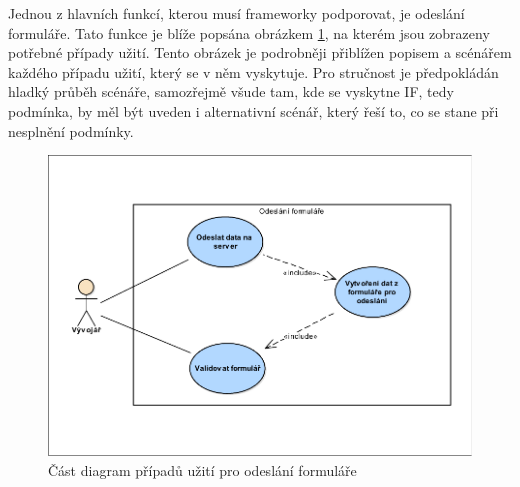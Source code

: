 Jednou z hlavních funkcí, kterou musí frameworky podporovat, je odeslání formuláře. Tato funkce je blíže popsána obrázkem \ref{img:useCaseModelFormSend}, na kterém jsou zobrazeny potřebné případy užití. Tento obrázek je podrobněji přiblížen popisem a scénářem každého případu užití, který se v něm vyskytuje. Pro stručnost je předpokládán hladký průběh scénáře, samozřejmě všude tam, kde se vyskytne IF, tedy podmínka, by měl být uveden i alternativní scénář, který řeší to, co se stane při nesplnění podmínky.
\begin{figure}[h!]
\includegraphics[width=\textwidth]{figures/useCaseFormSend}
\caption{Část diagram případů užití pro odeslání formuláře}
\label{img:useCaseModelFormSend}
\end{figure}

